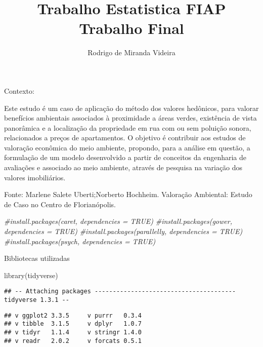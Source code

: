 \documentclass[
]{article}
\title{Trabalho Estatistica FIAP Trabalho Final}
\author{Rodrigo de Miranda Videira}
\date{}
\newenvironment{Shaded}{\begin{snugshade}}{\end{snugshade}}
\newcommand{\CommentTok}[1]{\textcolor[rgb]{0.56,0.35,0.01}{\textit{#1}}}
\newcommand{\FunctionTok}[1]{\textcolor[rgb]{0.00,0.00,0.00}{#1}}
\newcommand{\NormalTok}[1]{#1}
\begin{document}
\maketitle

Contexto:

Este estudo é um caso de aplicação do método dos valores hedônicos, para
valorar benefícios ambientais associados à proximidade a áreas verdes,
existência de vista panorâmica e a localização da propriedade em rua com
ou sem poluição sonora, relacionados a preços de apartamentos. O
objetivo é contribuir aos estudos de valoração econômica do meio
ambiente, propondo, para a análise em questão, a formulação de um modelo
desenvolvido a partir de conceitos da engenharia de avaliações e
associado ao meio ambiente, através de pesquisa na variação dos valores
imobiliários.

Fonte: Marlene Salete Uberti;Norberto Hochheim. Valoração Ambiental:
Estudo de Caso no Centro de Florianópolis.

\begin{Shaded}
\begin{Highlighting}[]
\CommentTok{\#install.packages(\textquotesingle{}caret\textquotesingle{}, dependencies = TRUE)}
\CommentTok{\#install.packages(\textquotesingle{}gower\textquotesingle{}, dependencies = TRUE)}
\CommentTok{\#install.packages(\textquotesingle{}parallelly\textquotesingle{}, dependencies = TRUE)}
\CommentTok{\#install.packages(\textquotesingle{}psych\textquotesingle{}, dependencies = TRUE)}
\end{Highlighting}
\end{Shaded}

Bibliotecas utilizadas

\begin{Shaded}
\begin{Highlighting}[]
\FunctionTok{library}\NormalTok{(tidyverse)}
\end{Highlighting}
\end{Shaded}

\begin{verbatim}
## -- Attaching packages --------------------------------------- tidyverse 1.3.1 --
\end{verbatim}

\begin{verbatim}
## v ggplot2 3.3.5     v purrr   0.3.4
## v tibble  3.1.5     v dplyr   1.0.7
## v tidyr   1.1.4     v stringr 1.4.0
## v readr   2.0.2     v forcats 0.5.1
\end{verbatim}
\end{document}
